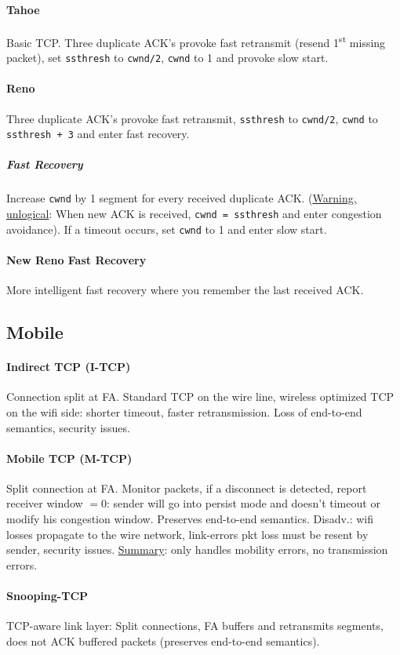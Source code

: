 \documentclass[6pt]{scrartcl}
\begin{document}
\begin{multicols}{4}
\paragraph{Tahoe} Basic TCP. Three duplicate ACK's provoke fast retransmit (resend 1\textsuperscript{st} missing packet), set \texttt{ssthresh} to \texttt{cwnd/2}, \texttt{cwnd} to 1 and provoke slow start.

\paragraph{Reno} Three duplicate ACK's provoke fast retransmit, \texttt{ssthresh} to \texttt{cwnd/2}, \texttt{cwnd} to \texttt{ssthresh + 3} and enter fast recovery.

\subparagraph{Fast Recovery} Increase \texttt{cwnd} by 1 segment for every received duplicate ACK. (\underline{Warning, unlogical}: When new ACK is received, \texttt{cwnd = ssthresh} and enter congestion avoidance). If a timeout occurs, set \texttt{cwnd} to 1 and enter slow start.
\paragraph{New Reno Fast Recovery} More intelligent fast recovery where you remember the last received ACK.

\subsection{Mobile}
\paragraph{Indirect TCP (I-TCP)} Connection split at FA. Standard TCP on the wire line, wireless optimized TCP on the wifi side: shorter timeout, faster retransmission. Loss of end-to-end semantics, security issues.
\paragraph{Mobile TCP (M-TCP)} Split connection at FA. Monitor packets, if a disconnect is detected, report receiver window $= 0$: sender will go into persist mode and doesn't timeout or modify his congestion window. Preserves end-to-end semantics. Disadv.: wifi losses propagate to the wire network, link-errors pkt loss must be resent by sender, security issues. \underline{Summary}: only handles mobility errors, no transmission errors.

\paragraph{Snooping-TCP} TCP-aware link layer: Split connections, FA buffers and retransmits segments, does not ACK buffered packets (preserves end-to-end semantics).


\end{multicols}
\end{document}
